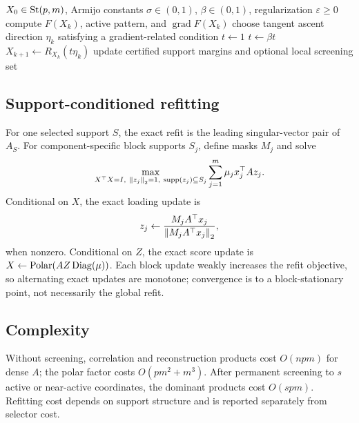 \begin{algorithm}[t]
\caption{Safeguarded active-set spectral ascent}
\label{alg:safeguarded}
\begin{algorithmic}[1]
\Require \(X_0\in\mathrm{St}(p,m)\), Armijo constants \(\sigma\in(0,1)\), \(\beta\in(0,1)\), regularization \(\varepsilon\ge0\)
  \State compute \(F(X_k)\), active pattern, and \(\operatorname{grad}F(X_k)\)
  \State choose tangent ascent direction \(\eta_k\) satisfying a gradient-related condition
  \State \(t\gets1\)
   \State \(t\gets\beta t\) \EndWhile
  \State \(X_{k+1}\gets R_{X_k}(t\eta_k)\)
  \State update certified support margins and optional local screening set
\EndFor
\end{algorithmic}
\end{algorithm}

\subsection{Support-conditioned refitting}
For one selected support \(S\), the exact refit is the leading singular-vector pair of \(A_S\). For component-specific block supports \(S_j\), define masks \(M_j\) and solve
\[
\max_{X^\top X=I,\ \norm{z_j}_2=1,\ \supp(z_j)\subseteq S_j}
\sum_{j=1}^m \mu_j x_j^\top A z_j.
\]
Conditional on \(X\), the exact loading update is
\[
z_j\leftarrow\frac{M_jA^\top x_j}{\left\lVert M_jA^\top x_j \right\rVert_2},
\]
when nonzero. Conditional on \(Z\), the exact score update is \(X\leftarrow\operatorname{Polar}(AZ\operatorname{Diag}(\mu))\). Each block update weakly increases the refit objective, so alternating exact updates are monotone; convergence is to a block-stationary point, not necessarily the global refit.

\subsection{Complexity}
Without screening, correlation and reconstruction products cost \(O(npm)\) for dense \(A\); the polar factor costs \(O(pm^2+m^3)\). After permanent screening to \(s\) active or near-active coordinates, the dominant products cost \(O(spm)\). Refitting cost depends on support structure and is reported separately from selector cost.
